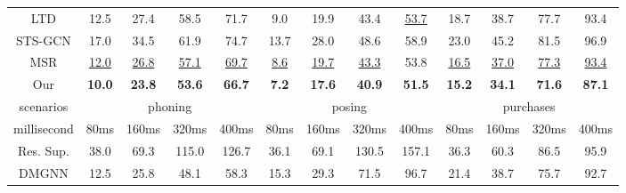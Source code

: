 \begin{table}[t]
{\begin{tabular}{c|cccc|cccc|cccc}
    LTD         & 12.5          & 27.4          & 58.5          & 71.7          & 9.0           & 19.9          & 43.4          & \underline{53.7}    & 18.7          & 38.7          & 77.7          & 93.4          \\
    STS-GCN      & 17.0          & 34.5          & 61.9          & 74.7          & 13.7          & 28.0          & 48.6          & 58.9          & 23.0          & 45.2          & 81.5          & 96.9          \\
    MSR         & \underline{12.0}    & \underline{26.8}    & \underline{57.1}    & \underline{69.7}    & \underline{8.6}     & \underline{19.7}    & \underline{43.3}    & 53.8          & \underline{16.5}    & \underline{37.0}    & \underline{77.3}    & \underline{93.4}    \\
    Our         & \textbf{10.0} & \textbf{23.8} & \textbf{53.6} & \textbf{66.7} & \textbf{7.2}  & \textbf{17.6} & \textbf{40.9} & \textbf{51.5} & \textbf{15.2} & \textbf{34.1} & \textbf{71.6} & \textbf{87.1} \\ \hline
    scenarios   & \multicolumn{4}{c|}{phoning}                                   & \multicolumn{4}{c|}{posing}                                    & \multicolumn{4}{c}{purchases}                                 \\\hline
    millisecond & 80ms          & 160ms         & 320ms         & 400ms         & 80ms          & 160ms         & 320ms         & 400ms         & 80ms          & 160ms         & 320ms         & 400ms         \\ \hline
    Res. Sup.   & 38.0          & 69.3          & 115.0         & 126.7         & 36.1          & 69.1          & 130.5         & 157.1         & 36.3          & 60.3          & 86.5          & 95.9          \\
    DMGNN       & 12.5          & 25.8          & 48.1          & 58.3          & 15.3          & 29.3          & 71.5          & 96.7          & 21.4          & 38.7          & 75.7          & 92.7          \\
    

\end{tabular}}
\end{table}

